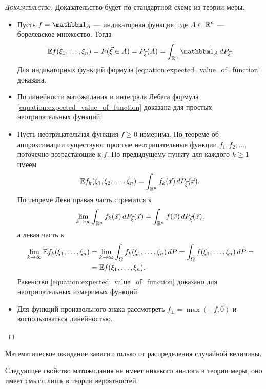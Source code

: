 \documentclass[../main.tex]{subfiles}
\begin{document}
\begin{proof}[\normalfont\textsc{Доказательство}]
 Доказательство будет по стандартной схеме из теории меры.
 \begin{itemize}
  \item Пусть $ f = \Ind_A $ --- индикаторная функция, где $ A \subset \mathbb{R}^{n} $ --- борелевское множество. Тогда
   \begin{align*}
    \E f (\xi_1, \ldots, \xi_n) = P(\vec\xi \in A) = P_{\vec\xi}(A) = \int_{\R^{n}} \Ind_A\,dP_{\vec\xi}.
   \end{align*}  Для индикаторных функций формула \eqref{equation:expected_value_of_function} доказана.
  \item По линейности матожидания и интеграла Лебега формула \eqref{equation:expected_value_of_function} доказана для простых неотрицательных функций.
  \item Пусть неотрицательная функция $ f \geqslant 0 $ измерима. По теореме об аппроксимации существуют простые неотрицательные функции $ f_1,f_2, \ldots $, поточечно возрастающие к $ f $. По предыдущему пункту для каждого $ k \geqslant 1 $ имеем \begin{align*}
    \mathbb E f_k(\xi_1, \xi_2, \ldots, \xi_n) = \int_{\mathbb{R}^{n}} f_k(\vec x) \,dP_{\vec\xi}(\vec x).
   \end{align*} По теореме Леви правая часть стремится к
   \begin{align*}
    \lim_{k \to \infty} \int_{\mathbb{R}^{n}} f_k(\vec x)  \,dP_{\vec\xi}(\vec x) = \int_{\mathbb{R}^{n}} f(\vec x)\,dP_{\vec\xi} (\vec x),
   \end{align*} а левая часть к
   \begin{align*}
    \lim_{k \to \infty} \mathbb E f_k (\xi_1, \ldots, \xi_n) &= \lim_{k \to \infty} \int_{\Omega} f_k(\xi_1, \ldots, \xi_n) \,dP = \int_{\Omega} f(\xi_1, \ldots, \xi_n)\,dP = \\
    &= \mathbb E f(\xi_1, \ldots, \xi_n).
   \end{align*} Равенство \eqref{equation:expected_value_of_function} доказано для неотрицательных измеримых функций.
  \item Для функций произвольного знака рассмотреть $ f_\pm = \max(\pm f, 0) $ и воспользоваться линейностью.
 \end{itemize}
\end{proof}
\begin{crly}
 Математическое ожидание зависит только от распределения случайной величины.
\end{crly}

Следующее свойство матожидания не имеет никакого аналога в теории меры, оно имеет смысл лишь в теории вероятностей.
\end{document}
